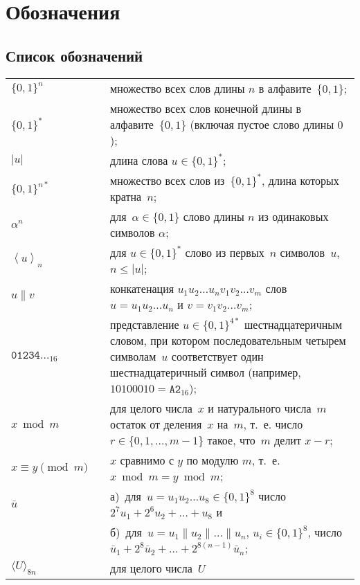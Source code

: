 \chapter{Обозначения}\label{DEFS}

\section{Список обозначений}

{\tabcolsep 0pt
\begin{longtable}{lrp{13.5cm}}
$\{0,1\}^n$  & \hspace{2mm} &
множество всех слов длины $n$ в алфавите~$\{0,1\}$;
\\[4pt]
$\{0,1\}^*$  &&
множество всех слов конечной длины в алфавите~$\{0,1\}$
(включая пустое слово длины $0$);
\\[4pt]
$|u|$      &&
длина слова $u\in\{0,1\}^*$;
\\[4pt]
%
$\{0,1\}^{n*}$  &&
множество всех слов из~$\{0,1\}^*$,
длина которых кратна~$n$;
\\[4pt]
%
$\alpha^n$  &&
для~$\alpha\in\{0,1\}$ слово длины $n$ из одинаковых символов $\alpha$;
\\[4pt]
%
%
$\left\langle u\right\rangle_n$  &&
для $u\in\{0,1\}^*$
слово из первых~$n$ символов~$u$, $n\leq|u|$;
\\[4pt]
%
$u\parallel v$  &&
конкатенация
$u_1 u_2\ldots u_n v_1 v_2\ldots v_m$
слов
$u=u_1 u_2\ldots u_n$ и
$v=v_1 v_2\ldots v_m$;
\\[4pt]
%
$\texttt{01234\ldots}_{16}$ && 
представление $u\in\{0,1\}^{4*}$ шестнадцатеричным словом,
при котором последовательным четырем символам~$u$ соответствует
один шестнадцатеричный символ
(например, $10100010=\texttt{A2}_{16}$);
\\[4pt]
%
$x\bmod m$             &&
для целого числа~$x$ и натурального числа~$m$ 
остаток от деления~$x$ на~$m$,
т.~е. число $r\in\{0,1,\ldots,m-1\}$ такое, что~$m$ делит $x-r$;
\\[4pt]
%
$x\equiv y\pmod m$    &&
$x$ сравнимо с $y$ по модулю $m$, т.~е. $x\bmod m=y\bmod m$;
\\[4pt]
%
$\bar u$                &&
а)~для~$u=u_1 u_2\ldots u_8\in\{0,1\}^8$
число $2^7 u_1+2^6 u_2+\ldots+u_8$ и\\[2pt]
%
                        &&
б)~для~$u=u_1\parallel u_2\parallel\ldots\parallel u_n$, $u_i\in\{0,1\}^8$,
число~$\bar u_1+2^8\bar u_2+\ldots+2^{8(n-1)}\bar u_n$;
\\[4pt]
%
$\langle U\rangle_{8n}$ &&
для целого числа~$U$ 

\end{longtable}}
